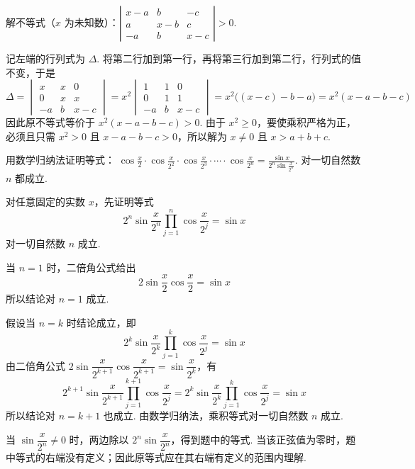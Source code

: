 \documentclass[UTF8,a4paper,oneside,11pt]{ctexbook}
\begin{document}
\begin{problem}
解不等式（\(x\) 为未知数）：\( \left|\begin{matrix}x-a & b & -c \\ a & x-b & c \\ -a & b & x-c\end{matrix}\right| > 0 \).
\end{problem}

\begin{solution}
记左端的行列式为 \(\Delta\). 将第二行加到第一行，再将第三行加到第二行，行列式的值不变，于是
\[
\Delta=\begin{vmatrix}x&x&0\\0&x&x\\-a&b&x-c\end{vmatrix}
=x^2\begin{vmatrix}1&1&0\\0&1&1\\-a&b&x-c\end{vmatrix}
=x^2\bigl((x-c)-b-a\bigr)=x^2(x-a-b-c)
\]
因此原不等式等价于 \(x^2(x-a-b-c)>0\). 由于 \(x^2\geqslant0\)，要使乘积严格为正，必须且只需 \(x^2>0\) 且 \(x-a-b-c>0\)，所以解为 \(x\ne0\) 且 \(x>a+b+c\).
\end{solution}

\begin{problem}
用数学归纳法证明等式： \(\cos \frac{x}{2} \cdot \cos \frac{x}{2^2} \cdot \cos \frac{x}{2^3} \cdot \cdots \cdot \cos \frac{x}{2^n} = \frac{\sin x}{2^n \sin \frac{x}{2^n}}\). 对一切自然数 \(n\) 都成立.
\end{problem}

\begin{solution}
对任意固定的实数 \(x\)，先证明等式
\[
2^n\sin\frac{x}{2^n}\prod_{j=1}^{n}\cos\frac{x}{2^j}=\sin x
\]
对一切自然数 \(n\) 成立.

当 \(n=1\) 时，二倍角公式给出
\[
2\sin\frac{x}{2}\cos\frac{x}{2}=\sin x
\]
所以结论对 \(n=1\) 成立.

假设当 \(n=k\) 时结论成立，即
\[
2^k\sin\frac{x}{2^k}\prod_{j=1}^{k}\cos\frac{x}{2^j}=\sin x
\]
由二倍角公式 \(2\sin\dfrac{x}{2^{k+1}}\cos\dfrac{x}{2^{k+1}}=\sin\dfrac{x}{2^k}\)，有
\[
2^{k+1}\sin\frac{x}{2^{k+1}}\prod_{j=1}^{k+1}\cos\frac{x}{2^j}
=2^k\sin\frac{x}{2^k}\prod_{j=1}^{k}\cos\frac{x}{2^j}=\sin x
\]
所以结论对 \(n=k+1\) 也成立. 由数学归纳法，乘积等式对一切自然数 \(n\) 成立.

当 \(\sin\dfrac{x}{2^n}\ne0\) 时，两边除以 \(2^n\sin\dfrac{x}{2^n}\)，得到题中的等式. 当该正弦值为零时，题中等式的右端没有定义；因此原等式应在其右端有定义的范围内理解.
\end{solution}
\end{document}
